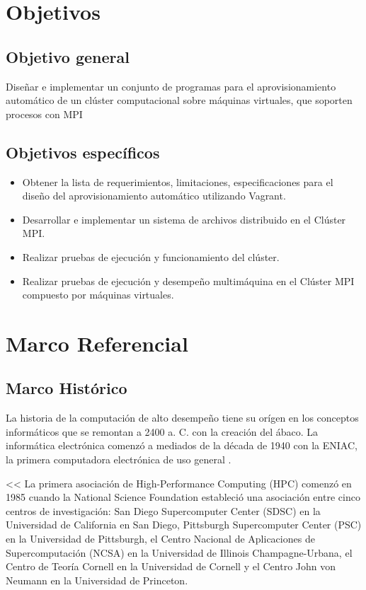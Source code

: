 \documentclass[letterpaper, 12pt, oneside]{article}
\begin{document}
	\section{Objetivos}
	
	\subsection{Objetivo general}
	
	Diseñar e implementar un conjunto de programas para el aprovisionamiento automático de un clúster computacional sobre máquinas virtuales, que soporten procesos con MPI
	
	\subsection{Objetivos específicos}
	\begin{itemize}
    	\item Obtener la lista de requerimientos, limitaciones, especificaciones para el diseño del aprovisionamiento automático utilizando Vagrant.
    	\item Desarrollar e implementar un sistema de archivos distribuido en el Clúster MPI.
        \item Realizar pruebas de ejecución y funcionamiento del clúster.
        \item Realizar pruebas de ejecución y desempeño multimáquina en el Clúster MPI compuesto por máquinas virtuales.
    \end{itemize}

    \section{Marco Referencial}
    \subsection{Marco Histórico}
    
    
    La historia de la computación de alto desempeño tiene su orígen en los conceptos informáticos que se remontan a 2400 a. C. con la creación del ábaco.
    La informática electrónica comenzó a mediados de la década de 1940 con la ENIAC, la primera computadora electrónica de uso general \cite{hpcHistory}.
    
   << La primera asociación de High-Performance Computing (HPC) comenzó en 1985 cuando la National Science Foundation estableció una asociación entre cinco centros de investigación: San Diego Supercomputer Center (SDSC) en la Universidad de California en San Diego, Pittsburgh Supercomputer Center (PSC) en la Universidad de Pittsburgh, el Centro Nacional de Aplicaciones de Supercomputación (NCSA) en la Universidad de Illinois Champagne-Urbana, el Centro de Teoría Cornell en la Universidad de Cornell y el Centro John von Neumann en la Universidad de Princeton.
    
\end{document}
